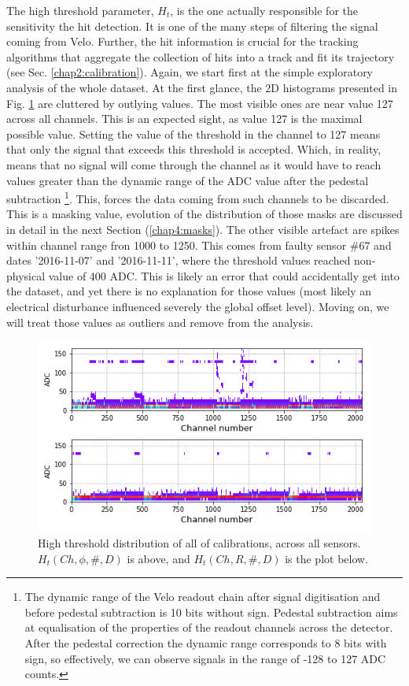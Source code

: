 The high threshold parameter, $H_{t}$, is the one actually responsible for the sensitivity the hit detection. It is one of the many steps of filtering the signal coming from Velo. Further, the hit information is crucial for the tracking algorithms that aggregate the collection of hits into a track and fit its trajectory (see Sec. \ref{chap2:calibration}).
Again, we start first at the simple exploratory analysis of the whole dataset. At the first glance, the 2D histograms presented in Fig. \ref{plot:part2-threshold-all} are cluttered by outlying values.
The most visible ones are near value 127 across all channels.
This is an expected sight, as value 127 is the maximal possible value.
Setting the value of the threshold in the channel to 127 means that only the signal that exceeds this threshold is accepted. Which, in reality, means that no signal will come through the channel as it would have to reach values greater than the dynamic range of the ADC value after the pedestal subtraction \footnote{The dynamic range of the Velo readout chain after signal digitisation and before pedestal subtraction is 10 bits without sign. Pedestal subtraction aims at equalisation of the properties of the readout channels across the detector. After the pedestal correction the dynamic range corresponds to 8 bits with sign, so effectively, we can observe signals in the range of -128 to 127 ADC counts.}. This, forces the data coming from such channels to be discarded.
This is a masking value, evolution of the distribution of those masks are discussed in detail in the next Section (\ref{chap4:masks}).
The other visible artefact are spikes within channel range fron 1000 to 1250.
This comes from faulty  sensor  \#67  and  dates  ’2016-11-07’  and  ’2016-11-11’,  where  the  threshold  values  reached non-physical value of 400  ADC. This is likely an error that could accidentally get into the dataset, and yet there is no explanation for those values (most likely an electrical disturbance influenced severely the global offset level).
Moving on, we will treat those values as outliers and remove from the analysis.

\begin{figure}
    \centering
    \includegraphics[width=0.7\linewidth]{figures/chapter4/calib_analysis/P2-threshold-all-r-phi.png}
    \caption{High threshold distribution of all of calibrations, across all sensors. $H_t(Ch,\phi,\#, D)$ is above, and $H_t(Ch,R,\#, D)$ is the plot below.}
    \label{plot:part2-threshold-all}
\end{figure}


